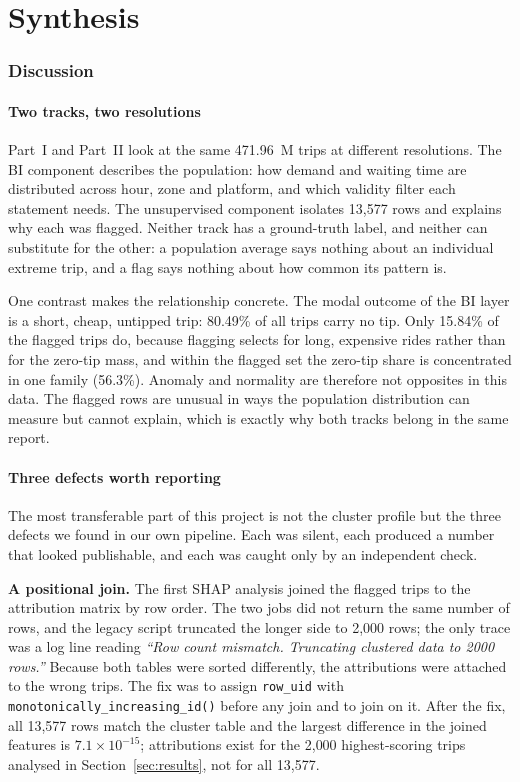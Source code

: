 \documentclass[11pt,a4paper]{article}
\newcommand{\code}[1]{\texttt{\small #1}}
\begin{document}
\part{Synthesis}

\section{Discussion}
\label{sec:discussion}

\subsection{Two tracks, two resolutions}

Part~I and Part~II look at the same 471.96~M trips at different resolutions. The BI component describes the population: how demand and waiting time are distributed across hour, zone and platform, and which validity filter each statement needs. The unsupervised component isolates 13{,}577 rows and explains why each was flagged. Neither track has a ground-truth label, and neither can substitute for the other: a population average says nothing about an individual extreme trip, and a flag says nothing about how common its pattern is.

One contrast makes the relationship concrete. The modal outcome of the BI layer is a short, cheap, untipped trip: 80.49\% of all trips carry no tip. Only 15.84\% of the flagged trips do, because flagging selects for long, expensive rides rather than for the zero-tip mass, and within the flagged set the zero-tip share is concentrated in one family (56.3\%). Anomaly and normality are therefore not opposites in this data. The flagged rows are unusual in ways the population distribution can measure but cannot explain, which is exactly why both tracks belong in the same report.

\subsection{Three defects worth reporting}
\label{sec:bugs}

The most transferable part of this project is not the cluster profile but the three defects we found in our own pipeline. Each was silent, each produced a number that looked publishable, and each was caught only by an independent check.

\textbf{A positional join.} The first SHAP analysis joined the flagged trips to the attribution matrix by row order. The two jobs did not return the same number of rows, and the legacy script truncated the longer side to 2{,}000 rows; the only trace was a log line reading \emph{``Row count mismatch. Truncating clustered data to 2000 rows.''} Because both tables were sorted differently, the attributions were attached to the wrong trips. The fix was to assign \code{row\_uid} with \code{monotonically\_increasing\_id()} before any join and to join on it. After the fix, all 13{,}577 rows match the cluster table and the largest difference in the joined features is $7.1 \times 10^{-15}$; attributions exist for the 2{,}000 highest-scoring trips analysed in Section~\ref{sec:results}, not for all 13{,}577.
\end{document}
